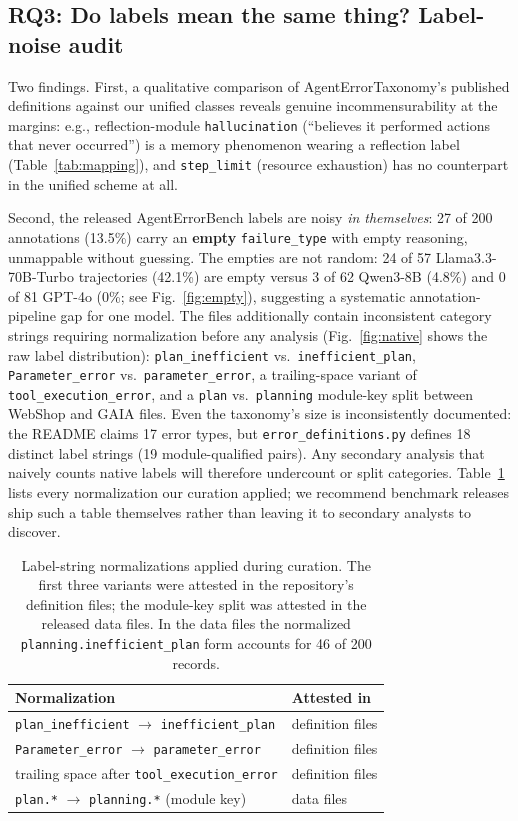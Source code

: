 \documentclass[12pt,letterpaper]{article}
\begin{document}
\subsection{RQ3: Do labels mean the same thing? Label-noise audit}
\label{sec:rq3}
Two findings. First, a qualitative comparison of AgentErrorTaxonomy's
published definitions against our unified classes reveals genuine
incommensurability at the margins: e.g., reflection-module
\texttt{hallucination} (``believes it performed actions that never
occurred'') is a memory phenomenon wearing a reflection label
(Table~\ref{tab:mapping}), and \texttt{step\_limit} (resource exhaustion)
has no counterpart in the unified scheme at all.

Second, the released AgentErrorBench labels are noisy \emph{in themselves}:
27 of 200 annotations (13.5\%) carry an \textbf{empty}
\texttt{failure\_type} with empty reasoning, unmappable without guessing.
The empties are not random: 24 of 57 Llama3.3-70B-Turbo trajectories (42.1\%)
are empty versus 3 of 62 Qwen3-8B (4.8\%) and 0 of 81 GPT-4o (0\%; see
Fig.~\ref{fig:empty}), suggesting a systematic annotation-pipeline gap for
one model. The files additionally contain inconsistent category strings
requiring normalization before any analysis (Fig.~\ref{fig:native} shows the
raw label distribution):
\texttt{plan\_inefficient} vs.\ \texttt{inefficient\_plan},
\texttt{Parameter\_error} vs.\ \texttt{parameter\_error}, a trailing-space
variant of \texttt{tool\_execution\_error}, and a \texttt{plan} vs.\
\texttt{planning} module-key split between WebShop and GAIA files. Even the
taxonomy's size is inconsistently documented: the README claims 17 error
types, but \texttt{error\_definitions.py} defines 18 distinct label strings
(19 module-qualified pairs). Any secondary analysis that naively counts
native labels will therefore undercount or split categories.
Table~\ref{tab:variants} lists every normalization our curation applied; we
recommend benchmark releases ship such a table themselves rather than leaving
it to secondary analysts to discover.

\begin{table}[t]
\centering\small
\caption{Label-string normalizations applied during curation. The first three
variants were attested in the repository's definition files; the module-key
split was attested in the released data files. In the data files the
normalized \texttt{planning.inefficient\_plan} form accounts for 46 of 200
records.}
\label{tab:variants}
\begin{tabular}{@{}ll@{}}
\toprule
Normalization & Attested in \\
\midrule
\texttt{plan\_inefficient} $\rightarrow$ \texttt{inefficient\_plan} & definition files \\
\texttt{Parameter\_error} $\rightarrow$ \texttt{parameter\_error} & definition files \\
trailing space after \texttt{tool\_execution\_error} & definition files \\
\texttt{plan.*} $\rightarrow$ \texttt{planning.*} (module key) & data files \\
\bottomrule
\end{tabular}
\end{table}
\end{document}
